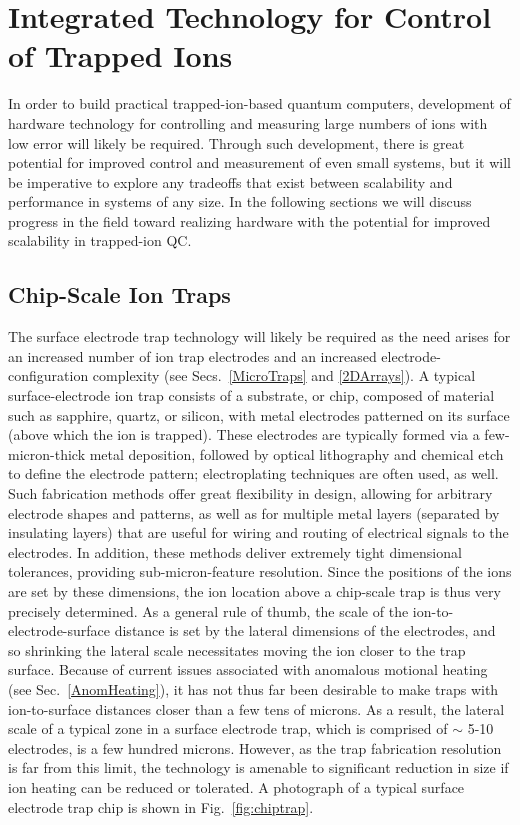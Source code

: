\documentclass[%
12pt,
 amsmath,amssymb,
]{revtex4-2}
\begin{document}
\section{Integrated Technology for Control of Trapped Ions}
\label{ScalableHardware}
In order to build practical trapped-ion-based quantum computers, development of hardware technology for controlling and measuring large numbers of ions with low error will likely be required.  Through such development, there is great potential for improved control and measurement of even small systems, but it will be imperative to explore any tradeoffs that exist between scalability and performance in systems of any size.  In the following sections we will discuss progress in the field toward realizing hardware with the potential for improved scalability in trapped-ion QC.

    \subsection{Chip-Scale Ion Traps}
The surface electrode trap technology will likely be required as the need arises for an increased number of ion trap electrodes and an increased electrode-configuration complexity (see Secs.~\ref{MicroTraps} and \ref{2DArrays}).  A typical surface-electrode ion trap consists of a substrate, or chip, composed of material such as sapphire, quartz, or silicon, with metal electrodes patterned on its surface (above which the ion is trapped).  These electrodes are typically formed via a few-micron-thick metal deposition, followed by optical lithography and chemical etch to define the electrode pattern; electroplating techniques are often used, as well.  Such fabrication methods offer great flexibility in design, allowing for arbitrary electrode shapes and patterns, as well as for multiple metal layers (separated by insulating layers) that are useful for wiring and routing of electrical signals to the electrodes.  In addition, these methods deliver extremely tight dimensional tolerances, providing sub-micron-feature resolution.  Since the positions of the ions are set by these dimensions, the ion location above a chip-scale trap is thus very precisely determined.  As a general rule of thumb, the scale of the ion-to-electrode-surface distance is set by the lateral dimensions of the electrodes, and so shrinking the lateral scale necessitates moving the ion closer to the trap surface.  Because of current issues associated with anomalous motional heating (see Sec.~\ref{AnomHeating}), it has not thus far been desirable to make traps with ion-to-surface distances closer than a few tens of microns.  As a result, the lateral scale of a typical zone in a surface electrode trap, which is comprised of $\sim$ 5-10 electrodes, is a few hundred microns.  However, as the trap fabrication resolution is far from this limit, the technology is amenable to significant reduction in size if ion heating can be reduced or tolerated.  A photograph of a typical surface electrode trap chip is shown in Fig.~\ref{fig:chiptrap}.
\end{document}
